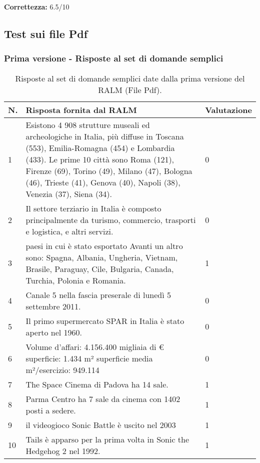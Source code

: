 \textbf{Correttezza:} 6.5/10


\subsection{Test sui file Pdf}

\subsubsection{Prima versione - Risposte al set di domande semplici}

\begin{table}[H]
    \centering
    \begin{tabular}{|p{0.5cm} |p{6cm} |p{2cm}|}
        \hline
        \textbf{N}. & \textbf{Risposta fornita dal RALM} & \textbf{Valutazione} \\
        \hline
        1 & Esistono 4 908 strutture museali ed archeologiche in Italia, più diffuse in Toscana (553), Emilia-Romagna (454) e Lombardia (433). Le prime 10 città sono Roma (121), Firenze (69), Torino (49), Milano (47), Bologna (46), Trieste (41), Genova (40), Napoli (38), Venezia (37), Siena (34). & 0 \\
        \hline
        2 & Il settore terziario in Italia è composto principalmente da turismo, commercio, trasporti e logistica, e altri servizi. & 0 \\
        \hline
        3 & paesi in cui è stato esportato Avanti un altro sono: Spagna, Albania, Ungheria, Vietnam, Brasile, Paraguay, Cile, Bulgaria, Canada, Turchia, Polonia e Romania. & 1 \\
        \hline
        4 & Canale 5 nella fascia preserale di lunedì 5 settembre 2011. & 0 \\
        \hline
        5 & Il primo supermercato SPAR in Italia è stato aperto nel 1960. & 0 \\
        \hline
        6 & Volume d'affari: 4.156.400 migliaia di €
        superficie: 1.434 m²
        superficie media m²/esercizio: 949.114 & 0 \\
        \hline
        7 & The Space Cinema di Padova ha 14 sale. & 1 \\
        \hline
        8 & Parma Centro ha 7 sale da cinema con 1402 posti a sedere. & 1 \\
        \hline
        9 & il videogioco Sonic Battle è uscito nel 2003 & 1 \\
        \hline
        10 & Tails è apparso per la prima volta in Sonic the Hedgehog 2 nel 1992. & 1 \\
        \hline
    \end{tabular}
    \caption{Risposte al set di domande semplici date dalla prima versione del RALM (File Pdf).}
\end{table}

